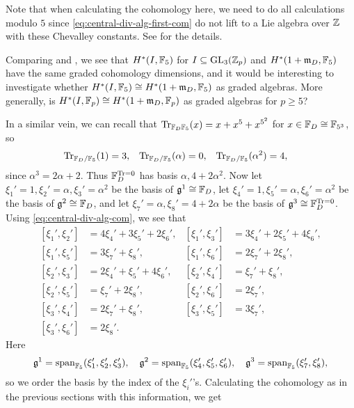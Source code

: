 \begin{remark}
  Note that when calculating the cohomology here, we need to do all calculations modulo $5$ since \eqref{eq:central-div-alg-first-com} do not lift to a Lie algebra over $\mathbb{Z}$ with these Chevalley constants. See \cite{code} for the details.
\end{remark}

Comparing  and , we see that $H^{*}(I,\mathbb{F}_{5})$ for $I \subseteq \operatorname{GL}_{3}(\mathbb{Z}_{p})$ and $H^{*}(1+\mathfrak{m}_{D},\mathbb{F}_{5})$ have the same graded cohomology dimensions, and it would be interesting to investigate whether $H^{*}(I,\mathbb{F}_{5}) \cong H^{*}(1+\mathfrak{m}_{D},\mathbb{F}_{5})$ as graded algebras. More generally, is $H^{*}(I,\mathbb{F}_{p}) \cong H^{*}(1+\mathfrak{m}_{D},\mathbb{F}_{p})$ as graded algebras for $p \geq 5$?

In a similar vein, we can recall that $\operatorname{Tr}_{\mathbb{F}_{D}\mathbb{F}_{5}}(x) = x + x^{5} + x^{5^{2}}$ for $x \in \mathbb{F}_{D} \cong \mathbb{F}_{5^{3}}$, so
\begin{align*}
  \operatorname{Tr}_{\mathbb{F}_{D}/\mathbb{F}_{5}}(1) &= 3, & \operatorname{Tr}_{\mathbb{F}_{D}/\mathbb{F}_{5}}(\alpha) &= 0, & \operatorname{Tr}_{\mathbb{F}_{D}/\mathbb{F}_{5}}(\alpha^{2}) &= 4,
\end{align*}
since $\alpha^{3} = 2\alpha + 2$. Thus $\mathbb{F}_{D}^{\operatorname{Tr} = 0}$ has basis $\alpha, 4+2\alpha^{2}$. Now let $\xi_{1}' = 1, \xi_{2}' = \alpha, \xi_{3}' = \alpha^{2}$ be the basis of $\mathfrak{g}^{1} \cong \mathbb{F}_{D}$, let $\xi_{4}' = 1, \xi_{5}' = \alpha, \xi_{6}' = \alpha^{2}$ be the basis of $\mathfrak{g}^{2} \cong \mathbb{F}_{D}$, and let $\xi_{7}' = \alpha, \xi_{8}' = 4+2\alpha$ be the basis of $\mathfrak{g}^{3} \cong \mathbb{F}_{D}^{\operatorname{Tr} = 0}$. Using \eqref{eq:central-div-alg-com}, we see that
\clearpage
\begin{equation}\label{eq:central-div-alg-second-com}
  \begin{aligned}
    [\xi_{1}',\xi_{2}'] &= 4\xi_{4}' + 3\xi_{5}' + 2\xi_{6}', & [\xi_{1}',\xi_{3}'] &= 3\xi_{4}' + 2\xi_{5}' + 4\xi_{6}', \\
    [\xi_{1}',\xi_{5}'] &= 3\xi_{7}' + \xi_{8}', & [\xi_{1}',\xi_{6}'] &= 2\xi_{7}' + 2\xi_{8}', \\
    [\xi_{2}',\xi_{3}'] &= 2\xi_{4}' + \xi_{5}' + 4\xi_{6}', & [\xi_{2}',\xi_{4}'] &= \xi_{7}' + \xi_{8}', \\
    [\xi_{2}',\xi_{5}'] &= \xi_{7}' + 2\xi_{8}', & [\xi_{2}',\xi_{6}'] &= 2\xi_{7}', \\
    [\xi_{3}',\xi_{4}'] &= 2\xi_{7}' + \xi_{8}', & [\xi_{3}',\xi_{5}'] &= 3\xi_{7}', \\
    [\xi_{3}',\xi_{6}'] &= 2\xi_{8}'.
  \end{aligned}
\end{equation}
Here
\begin{equation*}
  \mathfrak{g}^{1} = \operatorname{span}_{\mathbb{F}_{5}}(\xi_{1}',\xi_{2}',\xi_{3}'), \quad \mathfrak{g}^{2} = \operatorname{span}_{\mathbb{F}_{5}}(\xi_{4}',\xi_{5}',\xi_{6}'), \quad \mathfrak{g}^{3} = \operatorname{span}_{\mathbb{F}_{5}}(\xi_{7}',\xi_{8}'),
\end{equation*}
so we order the basis by the index of the $\xi_{i}'$'s. Calculating the cohomology as in the previous sections with this information, we get 

